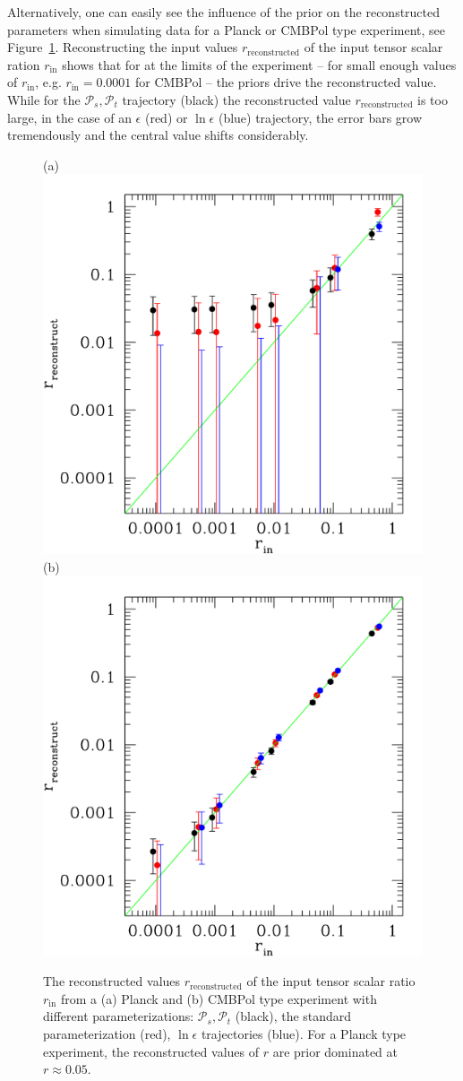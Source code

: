 \documentclass[a4paper,11pt]{article}
\newcommand{\pscalar}{{\mathcal{P}_s}}
\newcommand{\ptensor}{{\mathcal{P}_t}}
\begin{document}
Alternatively, one can easily see the influence of the prior on the
reconstructed parameters when simulating data for a Planck or CMBPol
type experiment, see Figure~\ref{fig:rin_rout}. Reconstructing the
input values $r_{\mathrm{reconstructed}}$ of the input tensor scalar
ration $r_{\mathrm{in}}$ shows that for at the limits of the
experiment -- for small enough values of $r_{\mathrm{in}}$,
e.g. $r_{\mathrm{in}}=0.0001$ for CMBPol -- the priors drive the
reconstructed value.  While for the $\pscalar, \ptensor$ trajectory
(black) the reconstructed value $r_{\mathrm{reconstructed}}$ is too
large, in the case of an $\epsilon$ (red) or $\ln\epsilon$ (blue)
trajectory, the error bars grow tremendously and the central value
shifts considerably.
\begin{figure}
  (a)\includegraphics[width=0.45\linewidth]{scanning_rin_rout_planck}
  (b)\includegraphics[width=0.45\linewidth]{scanning_rin_rout}

  \caption{The reconstructed values $r_{\mathrm{reconstructed}}$ of
  the input tensor scalar ratio $r_{\mathrm{in}}$ from a (a) Planck
  and (b) CMBPol type experiment with different parameterizations:
  $\pscalar, \ptensor$ (black), the standard parameterization (red),
  $\ln\epsilon$ trajectories (blue). For a Planck type experiment, the
  reconstructed values of $r$ are prior dominated at $r\approx0.05$.}

   \label{fig:rin_rout}
\end{figure}
\end{document}
